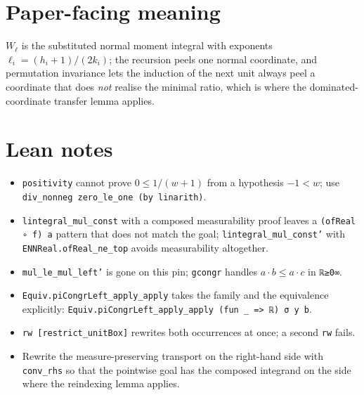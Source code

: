 \documentclass[11pt]{article}
\begin{document}
\section{Paper-facing meaning}
$W_\ell$ is the substituted normal moment integral with exponents $\ell_i=(h_i+1)/(2k_i)$; the
recursion peels one normal coordinate, and permutation invariance lets the induction of the next
unit always peel a coordinate that does \emph{not} realise the minimal ratio, which is where the
dominated-coordinate transfer lemma applies.

\section{Lean notes}
\begin{itemize}
\item \texttt{positivity} cannot prove $0\le1/(w+1)$ from a hypothesis $-1<w$; use
\texttt{div\_nonneg zero\_le\_one (by linarith)}.
\item \texttt{lintegral\_mul\_const} with a composed measurability proof leaves a
\texttt{(ofReal ∘ f) a} pattern that does not match the goal; \texttt{lintegral\_mul\_const'} with
\texttt{ENNReal.ofReal\_ne\_top} avoids measurability altogether.
\item \texttt{mul\_le\_mul\_left'} is gone on this pin; \texttt{gcongr} handles
$a\cdot b\le a\cdot c$ in \texttt{ℝ≥0∞}.
\item \texttt{Equiv.piCongrLeft\_apply\_apply} takes the family and the equivalence explicitly:
\texttt{Equiv.piCongrLeft\_apply\_apply (fun \_ => ℝ) σ y b}.
\item \texttt{rw [restrict\_unitBox]} rewrites both occurrences at once; a second \texttt{rw} fails.
\item Rewrite the measure-preserving transport on the right-hand side with \texttt{conv\_rhs} so
that the pointwise goal has the composed integrand on the side where the reindexing lemma applies.
\end{itemize}
\end{document}
